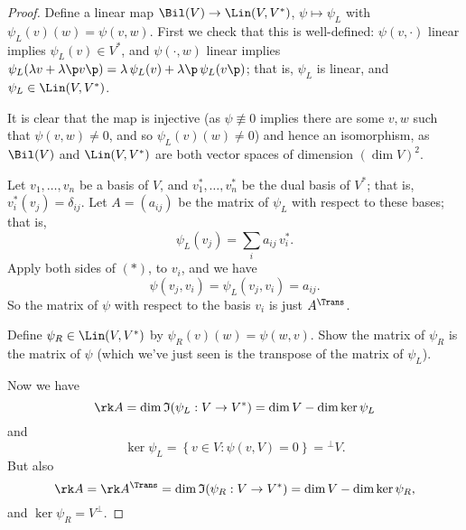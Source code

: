 \begin{proof}
	Define a linear map $\Bil(V) \to \Lin(V,V^*)$, $\psi\mapsto\psi_L$ with $\psi_L(v)(w) = \psi(v,w)$. First we check that this is well-defined: $\psi(v,\cdot)$ linear implies $\psi_L(v) \in V^*$, and $\psi(\cdot,w)$ linear implies $\psi_L(\lambda v + \lambda\p v\p) = \lambda\,\psi_L(v) + \lambda\p\,\psi_L(v\p)$; that is, $\psi_L$ is linear, and $\psi_L\in \Lin(V,V^*)$. %
	
	It is clear that the map is injective (as $\psi\not\equiv 0$ implies there are some $v,w$ such that $\psi(v,w)\neq 0$, and so $\psi_L(v)(w)\neq 0$) and hence an isomorphism, as $\Bil(V)$ and $\Lin(V,V^*)$ are both vector spaces of dimension $\left( \dim V \right)^2$. %
	
	Let $v_1,\ldots,v_n $ be a basis of $V$, and $v_1^*,\ldots,v_n^*$ be the dual basis of $V^*$; that is, $v_i^*(v_j) = \delta_{ij}$. Let $A=(a_{ij})$ be the matrix of $\psi_L$ with respect to these bases; that is, %
	\begin{equation*}
		\psi_L(v_j) = \sum_i a_{ij} \, v_i^*. \tag{$*$}
	\end{equation*}
	Apply both sides of $(*)$, to $v_i$, and we have
	\begin{equation*}
		\psi(v_j,v_i) = \psi_L(v_j,v_i) = a_{ij}.
	\end{equation*}
	So the matrix of $\psi$ with respect to the basis $v_i$ is just $A^\Trans$.
	
	\begin{exercise}
		Define $\psi_R\in \Lin(V,V^*)$ by $\psi_R(v)(w) = \psi(w,v)$. Show the matrix of $\psi_R$ is the matrix of $\psi$ (which we've just seen is the transpose of the matrix of $\psi_L$). %
	\end{exercise}
	
	Now we have
	\begin{equation*}
		\rk A = \dim \Im(\psi_L:V \to V^*) = \dim V - \dim\ker\psi_L
	\end{equation*}
	and
	\begin{equation*}
		\ker \psi_L = \left\{v\in V: \psi(v,V) = 0\right\} = {}^\perp V.
	\end{equation*}
	But also
	\begin{equation*}
		\rk A = \rk A^\Trans = \dim\Im(\psi_R:V \to V^*) = \dim V - \dim\ker\psi_R,
	\end{equation*}
	and $\ker\psi_R = V^\perp$.
\end{proof}

